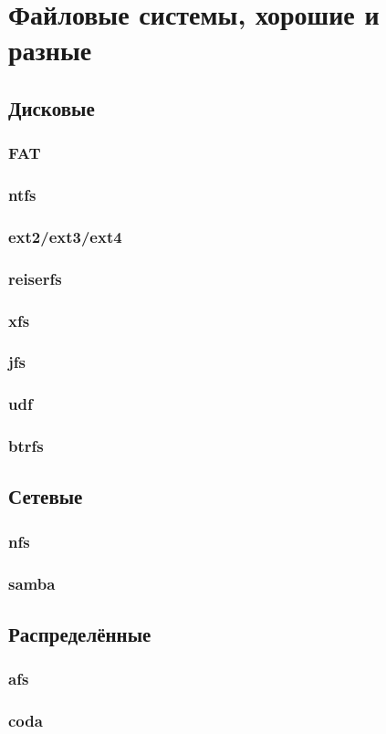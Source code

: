 \chapter{Файловые системы, хорошие и разные}
\section{Дисковые}
\subsection{FAT}
\subsection{ntfs}
\subsection{ext2/ext3/ext4}
\subsection{reiserfs}
\subsection{xfs}
\subsection{jfs}
\subsection{udf}
\subsection{btrfs}
\section{Сетевые}
\subsection{nfs}
\subsection{samba}
\section{Распределённые}
\subsection{afs}
\subsection{coda}
